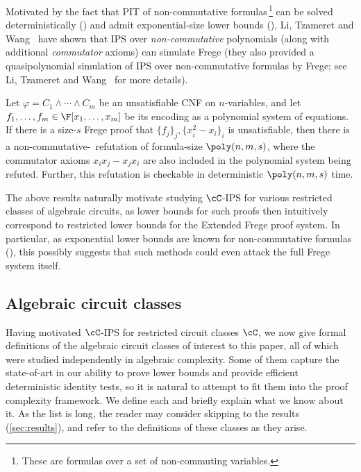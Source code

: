 \documentclass{toc}
\begin{document}
Motivated by the fact that PIT of non-commutative formulas\,\footnote{These are formulas over a set of non-commuting variables.} can be solved deterministically (\cite{RazShpilka05}) and admit
exponential-size lower bounds (\cite{Nisan91}), Li, Tzameret and Wang~\cite{LiTW15} have shown that IPS over \emph{non-commutative} polynomials (along with additional \emph{commutator} axioms) can simulate Frege (they also provided a quasipolynomial simulation of IPS over non-commutative formulas by Frege; see Li, Tzameret and Wang~\cite{LiTW15} for more details).

\begin{theoremwp}\label{thm:LTW}
        Let $\varphi=C_1\wedge\cdots\wedge C_m$ be an unsatisfiable CNF on $n$-variables, and let $f_1,\ldots,f_m\in\F[x_1,\ldots,x_m]$ be its encoding as a polynomial system of equations. If there is a size-$s$ Frege proof that $\{f_j\}_j,\{x_i^2-x_i\}_i$ is unsatisfiable, then there is a non-commutative-\IPS\ refutation of formula-size $\poly(n,m,s)$, where the commutator axioms $x_ix_j-x_jx_i$ are also included in the polynomial system being refuted. Further, this refutation is checkable in deterministic $\poly(n,m,s)$ time.
\end{theoremwp}

The above results naturally motivate studying $\cC$-IPS for various restricted classes of algebraic circuits, as lower bounds for such proofs then intuitively correspond to restricted lower bounds for the Extended Frege proof system.  In particular, as exponential lower bounds are known for non-commutative formulas (\cite{Nisan91}), this possibly suggests that such methods could even attack the full Frege system itself.

\subsection{Algebraic circuit classes}\label{sec:intro:circuits}

Having motivated $\cC$-IPS for restricted circuit classes $\cC$, we now give formal definitions of the algebraic circuit classes of interest to this paper, all of which were studied independently in algebraic complexity. Some of them capture the state-of-art in our ability to prove lower bounds and provide efficient deterministic identity tests, so it is natural to attempt to fit them into the proof complexity framework. We define each and briefly explain what we know about it. As the list is long, the reader may consider skipping to the results (\autoref{sec:results}), and refer to the definitions of these classes as they arise.
\end{document}
